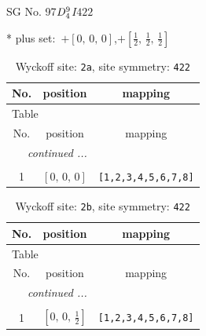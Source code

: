 \documentclass[fleqn,8pt]{jsarticle}
\begin{document}
\setcounter{MaxMatrixCols}{32}

\renewcommand{\tablename}{Table~}
\renewcommand{\figurename}{Figure~}
\begin{center}
\LARGE
SG No. 97\quad$D_{\rm 4}^{9}$\quad$I422$\quad[ tetragonal ]
\end{center}
* plus set:\,\,\,$+\left[ 0,\, 0,\, 0 \right]$,\quad $+\left[ \frac{1}{2},\, \frac{1}{2},\, \frac{1}{2} \right]$
\renewcommand{\arraystretch}{1.2}
\begin{longtable}{ccc}
\caption{Wyckoff site: {\tt 2a}, site symmetry: {\tt 422}}
 \\
 \hline \hline
No. & position & mapping \\ \hline \endfirsthead

\multicolumn{2}{l}{\tablename\ \thetable{}} \\
 \hline \hline
No. & position & mapping \\ \hline \endhead

 \hline \hline
\multicolumn{2}{r}{\footnotesize\it continued ...} \\ \endfoot

 \hline \hline
\multicolumn{2}{r}{} \\ \endlastfoot

1 & $\left[ 0,\, 0,\, 0 \right]$ & {\tt [1,2,3,4,5,6,7,8]} \\
\end{longtable}
\renewcommand{\arraystretch}{1.2}
\begin{longtable}{ccc}
\caption{Wyckoff site: {\tt 2b}, site symmetry: {\tt 422}}
 \\
 \hline \hline
No. & position & mapping \\ \hline \endfirsthead

\multicolumn{2}{l}{\tablename\ \thetable{}} \\
 \hline \hline
No. & position & mapping \\ \hline \endhead

 \hline \hline
\multicolumn{2}{r}{\footnotesize\it continued ...} \\ \endfoot

 \hline \hline
\multicolumn{2}{r}{} \\ \endlastfoot

1 & $\left[ 0,\, 0,\, \frac{1}{2} \right]$ & {\tt [1,2,3,4,5,6,7,8]} \\
\end{longtable}
\renewcommand{\arraystretch}{1.2}
\end{document}
